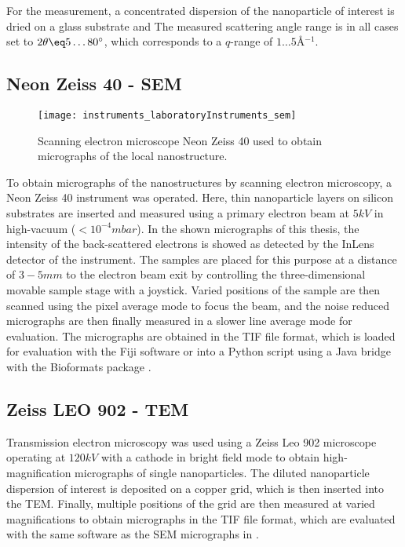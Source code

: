 \documentclass[\main/dresen_thesis.tex]{subfiles}
\begin{document}
    For the measurement, a concentrated dispersion of the nanoparticle of interest is dried on a glass substrate and
    The measured scattering angle range is in all cases set to $2 \theta \eq 5 \ldots 80^\circ$, which corresponds to a $q$-range of $1 \ldots 5 \unit{\angstrom^{-1}}$.


    \subsection{Neon Zeiss 40 - SEM}
      \label{ch:instruments:laboratoryInstruments:sem}
      \begin{figure}[ht]
        \centering
        \texttt{[image: instruments\_laboratoryInstruments\_sem]}
        \caption{\label{fig:appendix:instruments:sem}Scanning electron microscope Neon Zeiss 40 used to obtain micrographs of the local nanostructure.}
      \end{figure}
      To obtain micrographs of the nanostructures by scanning electron microscopy, a Neon Zeiss 40 instrument was operated.
      Here, thin nanoparticle layers on silicon substrates are inserted and measured using a primary electron beam at $5 \unit{kV}$ in high-vacuum ($< 10^{-4} \unit{mbar}$).
      In the shown micrographs of this thesis, the intensity of the back-scattered electrons is showed as detected by the InLens detector of the instrument.
      The samples are placed for this purpose at a distance of $3 - 5 \unit{mm}$ to the electron beam exit by controlling the three-dimensional movable sample stage with a joystick.
      Varied positions of the sample are then scanned using the pixel average mode to focus the beam, and the noise reduced micrographs are then finally measured in a slower line average mode for evaluation.
      The micrographs are obtained in the TIF file format, which is loaded for evaluation with the Fiji software \cite{Schindelin_2012_Fijia} or into a Python script using a Java bridge with the Bioformats package \cite{Linkert_2010_Metad}.

    \subsection{Zeiss LEO 902 - TEM}
      \label{ch:instruments:laboratoryInstruments:tem}
      Transmission electron microscopy was used using a Zeiss Leo 902 microscope operating at $120 \unit{kV}$ with a  cathode in bright field mode to obtain high-magnification micrographs of single nanoparticles.
      The diluted nanoparticle dispersion of interest is deposited on a copper grid, which is then inserted into the TEM.
      Finally, multiple positions of the grid are then measured at varied magnifications to obtain micrographs in the TIF file format, which are evaluated with the same software as the SEM micrographs in .
\end{document}
